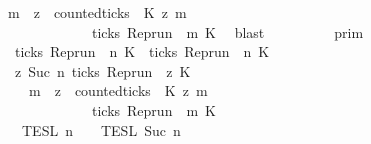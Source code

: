 \begin{isabellebody}
\ \ \ \ \ \ \ \ \ \ \ \ \ \ \ \ \ {\isacharparenleft}{\isasymforall}m\ {\isasymge}\ z{\isachardot}\ \ counted{\isacharunderscore}ticks\ {\isasymrho}\ K\ z\ m\ {}\isanewline
\ \ \ \ \ \ \ \ \ \ \ \ \ \ \ \ \ \ \ \ \ \ \ \ \ \ \ \ {\isasymlongrightarrow}\ ticks\ {\isacharparenleft}{\isacharparenleft}Rep{\isacharunderscore}run\ {\isasymrho}{\isacharparenright}\ m\ K\ \isamarkupfalse%
\ blast\isanewline
\ \ \isamarkupfalse%
\ \isamarkupfalse%
\ {\isacartoucheopen}{\isachardot}{\isachardot}{\isachardot}\ {\isacharequal}\ {\isasymlbrakk}{\isasymlbrakk}\ {\isasymGamma}\ {\isasymrbrakk}{\isasymrbrakk}\isactrlsub p\isactrlsub r\isactrlsub i\isactrlsub m\isanewline
\ \ \ \ \ \ \ \ \ \ \ \ \ \ \ \ {\isasyminter}\ {\isacharbraceleft}{\isasymrho}{\isachardot}\ ticks\ {\isacharparenleft}{\isacharparenleft}Rep{\isacharunderscore}run\ {\isasymrho}{\isacharparenright}\ n\ K\ {\isasymlongrightarrow}\ ticks\ {\isacharparenleft}{\isacharparenleft}Rep{\isacharunderscore}run\ {\isasymrho}{\isacharparenright}\ n\ K\ {\isacharbraceright}\isanewline
\ \ \ \ \ \ \ \ \ \ \ \ \ \ \ \ {\isasyminter}\ {\isacharbraceleft}{\isasymrho}{\isachardot}\ {\isasymforall}z{\isasymge}\ Suc\ n{\isachardot}\ ticks\ {\isacharparenleft}{\isacharparenleft}Rep{\isacharunderscore}run\ {\isasymrho}{\isacharparenright}\ z\ K\ {\isasymlongrightarrow}\isanewline
\ \ \ \ \ \ \ \ \ \ \ \ \ \ \ \ \ \ \ \ {\isacharparenleft}{\isasymforall}m\ {\isasymge}\ z{\isachardot}\ \ counted{\isacharunderscore}ticks\ {\isasymrho}\ K\ z\ m\ {}\isanewline
\ \ \ \ \ \ \ \ \ \ \ \ \ \ \ \ \ \ \ \ \ \ \ \ \ \ \ \ {\isasymlongrightarrow}\ ticks\ {\isacharparenleft}{\isacharparenleft}Rep{\isacharunderscore}run\ {\isasymrho}{\isacharparenright}\ m\ K\ {\isacharbraceright}\isanewline
\ \ \ \ \ \ \ \ \ \ \ \ \ \ \ \ {\isasyminter}\ {\isasymlbrakk}{\isasymlbrakk}\ {\isasymPsi}\ {\isasymrbrakk}{\isasymrbrakk}\isactrlsub T\isactrlsub E\isactrlsub S\isactrlsub L\isactrlbsup {\isasymge}\ n\isactrlesup \ {\isasyminter}\ {\isasymlbrakk}{\isasymlbrakk}\ {\isasymPhi}\ {\isasymrbrakk}{\isasymrbrakk}\isactrlsub T\isactrlsub E\isactrlsub S\isactrlsub L\isactrlbsup {\isasymge}\ Suc\ n\isactrlesup {\isacartoucheclose}\isanewline

\end{isabellebody}
